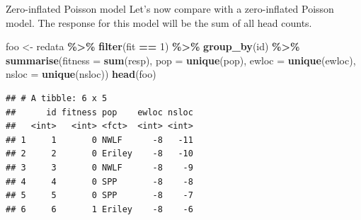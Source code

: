 \documentclass[
  ignorenonframetext,
]{beamer}
\newenvironment{Shaded}{\begin{snugshade}}{\end{snugshade}}
\newcommand{\AttributeTok}[1]{\textcolor[rgb]{0.13,0.29,0.53}{#1}}
\newcommand{\DecValTok}[1]{\textcolor[rgb]{0.00,0.00,0.81}{#1}}
\newcommand{\FunctionTok}[1]{\textcolor[rgb]{0.13,0.29,0.53}{\textbf{#1}}}
\newcommand{\NormalTok}[1]{#1}
\newcommand{\OtherTok}[1]{\textcolor[rgb]{0.56,0.35,0.01}{#1}}
\newcommand{\SpecialCharTok}[1]{\textcolor[rgb]{0.81,0.36,0.00}{\textbf{#1}}}
\begin{document}
\begin{frame}[fragile]{Zero-inflated Poisson model}
\protect\hypertarget{zero-inflated-poisson-model}{}
Let's now compare with a zero-inflated Poisson model. The response for
this model will be the sum of all head counts.

\vspace{12pt}
\tiny

\begin{Shaded}
\begin{Highlighting}[]
\NormalTok{foo }\OtherTok{\textless{}{-}}\NormalTok{ redata }\SpecialCharTok{\%\textgreater{}\%} \FunctionTok{filter}\NormalTok{(fit }\SpecialCharTok{==} \DecValTok{1}\NormalTok{) }\SpecialCharTok{\%\textgreater{}\%} \FunctionTok{group\_by}\NormalTok{(id) }\SpecialCharTok{\%\textgreater{}\%} 
  \FunctionTok{summarise}\NormalTok{(}\AttributeTok{fitness =} \FunctionTok{sum}\NormalTok{(resp), }\AttributeTok{pop =} \FunctionTok{unique}\NormalTok{(pop), }
            \AttributeTok{ewloc =} \FunctionTok{unique}\NormalTok{(ewloc), }\AttributeTok{nsloc =} \FunctionTok{unique}\NormalTok{(nsloc))}
\FunctionTok{head}\NormalTok{(foo)}
\end{Highlighting}
\end{Shaded}

\begin{verbatim}
## # A tibble: 6 x 5
##      id fitness pop    ewloc nsloc
##   <int>   <int> <fct>  <int> <int>
## 1     1       0 NWLF      -8   -11
## 2     2       0 Eriley    -8   -10
## 3     3       0 NWLF      -8    -9
## 4     4       0 SPP       -8    -8
## 5     5       0 SPP       -8    -7
## 6     6       1 Eriley    -8    -6
\end{verbatim}
\end{frame}
\end{document}
